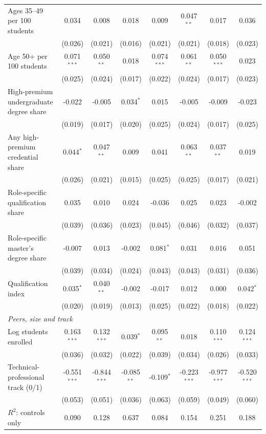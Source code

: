 \begin{table}[!htbp]
{\begin{tabular}{lccccccc}
\quad Ages 35--49 per 100 students & 0.034 & 0.008 & 0.018 & 0.009 & 0.047$^{**}$ & 0.017 & 0.036 \\
 & (0.026) & (0.021) & (0.016) & (0.021) & (0.021) & (0.018) & (0.023) \\
\quad Age 50+ per 100 students & 0.071$^{***}$ & 0.050$^{**}$ & 0.018 & 0.074$^{***}$ & 0.061$^{**}$ & 0.050$^{***}$ & 0.023 \\
 & (0.025) & (0.024) & (0.017) & (0.022) & (0.024) & (0.017) & (0.023) \\
\quad High-premium undergraduate degree share & -0.022 & -0.005 & 0.034$^{*}$ & 0.015 & -0.005 & -0.009 & -0.023 \\
 & (0.019) & (0.017) & (0.020) & (0.025) & (0.024) & (0.017) & (0.025) \\
\quad Any high-premium credential share & 0.044$^{*}$ & 0.047$^{**}$ & 0.009 & 0.041 & 0.063$^{**}$ & 0.037$^{**}$ & 0.019 \\
 & (0.026) & (0.021) & (0.015) & (0.025) & (0.025) & (0.017) & (0.021) \\
\quad Role-specific qualification share & 0.035 & 0.010 & 0.024 & -0.036 & 0.025 & 0.023 & -0.002 \\
 & (0.039) & (0.036) & (0.023) & (0.045) & (0.046) & (0.032) & (0.037) \\
\quad Role-specific master's degree share & -0.007 & 0.013 & -0.002 & 0.081$^{*}$ & 0.031 & 0.016 & 0.051 \\
 & (0.039) & (0.034) & (0.024) & (0.043) & (0.043) & (0.031) & (0.036) \\
\quad Qualification index & 0.035$^{*}$ & 0.040$^{**}$ & -0.002 & -0.017 & 0.012 & 0.000 & 0.042$^{*}$ \\
 & (0.020) & (0.019) & (0.013) & (0.025) & (0.022) & (0.018) & (0.022) \\
\multicolumn{8}{l}{\textit{Peers, size and track}} \\
\quad Log students enrolled & 0.163$^{***}$ & 0.132$^{***}$ & 0.039$^{*}$ & 0.095$^{**}$ & 0.018 & 0.110$^{***}$ & 0.124$^{***}$ \\
 & (0.036) & (0.032) & (0.022) & (0.039) & (0.034) & (0.026) & (0.033) \\
\quad Technical-professional track (0/1) & -0.551$^{***}$ & -0.844$^{***}$ & -0.085$^{**}$ & -0.109$^{*}$ & -0.223$^{***}$ & -0.977$^{***}$ & -0.520$^{***}$ \\
 & (0.053) & (0.051) & (0.036) & (0.063) & (0.059) & (0.049) & (0.060) \\
\midrule
$R^2$: controls only & 0.090 & 0.128 & 0.637 & 0.084 & 0.154 & 0.251 & 0.188 \\

\end{tabular}}
\end{table}
